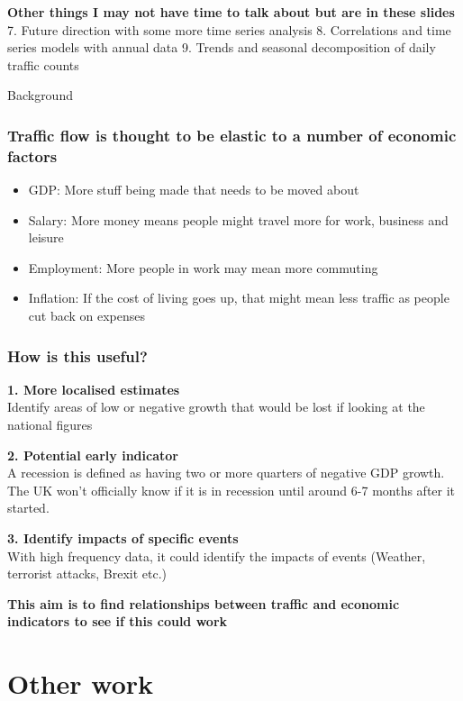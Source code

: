 \documentclass[11pt]{article}
\providecommand{\tightlist}{%
      \setlength{\itemsep}{0pt}\setlength{\parskip}{0pt}}
\begin{document}
\textbf{Other things I may not have time to talk about but are in these
slides} 7. Future direction with some more time series analysis 8.
Correlations and time series models with annual data 9. Trends and
seasonal decomposition of daily traffic counts

    Background

    \subsubsection{Traffic flow is thought to be elastic to a number of
economic
factors}\label{traffic-flow-is-thought-to-be-elastic-to-a-number-of-economic-factors}

\begin{itemize}
\tightlist
\item
  GDP: More stuff being made that needs to be moved about
\item
  Salary: More money means people might travel more for work, business
  and leisure
\item
  Employment: More people in work may mean more commuting
\item
  Inflation: If the cost of living goes up, that might mean less traffic
  as people cut back on expenses
\end{itemize}

    \subsubsection{How is this useful?}\label{how-is-this-useful}

    \textbf{1. More localised estimates}\\
Identify areas of low or negative growth that would be lost if looking
at the national figures

    \textbf{2. Potential early indicator}\\
A recession is defined as having two or more quarters of negative GDP
growth. The UK won't officially know if it is in recession until around
6-7 months after it started.

    \textbf{3. Identify impacts of specific events}\\
With high frequency data, it could identify the impacts of events
(Weather, terrorist attacks, Brexit etc.)

    \textbf{This aim is to find relationships between traffic and economic
indicators to see if this could work}

    \section{Other work}\label{other-work}
\end{document}
